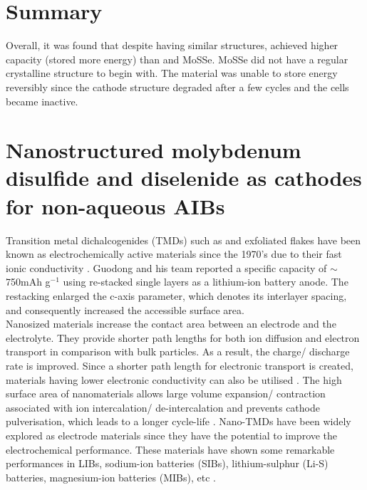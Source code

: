 \section{Summary}
Overall, it was found that despite having similar structures,  achieved higher capacity (stored more energy) than  and MoSSe. MoSSe did not have a regular crystalline structure to begin with. The material was unable to store energy reversibly since the cathode structure degraded after a few cycles and the cells became inactive.  

\newpage
\section{Nanostructured molybdenum disulfide and diselenide as cathodes for non-aqueous AIBs} \label{nanmol}
Transition metal dichalcogenides (TMDs) such as  and exfoliated  flakes have been known as electrochemically active materials since the 1970's due to their fast ionic conductivity \cite{du_superior_2010, whittingham_electrical_1976}. Guodong and his team reported a specific capacity of $\sim$750mAh g$^{-1}$ using re-stacked  single layers as a lithium-ion battery anode. The restacking enlarged the c-axis parameter, which denotes its interlayer spacing, and consequently increased the accessible surface area.\\
Nanosized materials increase the contact area between an electrode and the electrolyte. They provide shorter path lengths for both ion diffusion and electron transport in comparison with bulk particles. As a result, the charge/ discharge rate is improved. Since a shorter path length for electronic transport is created, materials having lower electronic conductivity can also be utilised \cite{pitchai_nanostructured_2011}. The high surface area of nanomaterials allows large volume expansion/ contraction associated with ion intercalation/ de-intercalation and prevents cathode pulverisation, which leads to a longer cycle-life \cite{zhang_ultrathin_2015, cong_intrinsic_2015}. Nano-TMDs have been widely explored as electrode materials since they have the potential to improve the electrochemical performance. 
These materials have shown some remarkable performances in LIBs, sodium-ion batteries (SIBs), lithium-sulphur (Li-S) batteries, magnesium-ion batteries (MIBs), etc \cite{xie_mos2/graphene_2015, cao_preparation_2013, dong_insights_2019, li_rechargeable_2018}.\\

